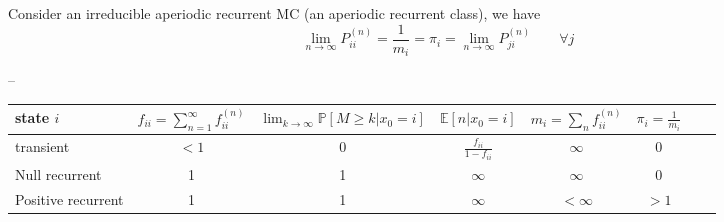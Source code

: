 \begin{theorem}
Consider an irreducible aperiodic recurrent MC (an aperiodic recurrent class), we have
$$ \lim_{n\to \infty} P_{ii}^{(n)} = \frac{1}{m_i} = \pi_i = \lim_{n\to\infty} P_{ji}^{(n)} \qquad \forall j$$
\end{theorem}
--

\begin{center}
    \begin{tabular}{|l*{6}{|c}r}
        \hline
    state $i$ & $f_{ii} = \sum_{n=1}^\infty f_{ii}^{(n)}$  & $\lim_{k \to \infty } \mathbb{P}[M \geq k | x_0=i]$ & $\mathbb{E}[n|x_0=i]$ & $m_i = \sum_n f_{ii}^{(n)}$ & $\pi_i = \frac{1}{m_i}$  \\ \hline
    
    transient & $<1$ & 0 & $\frac{f_{ii}}{1-f_{ii}}$ & $\infty$ & 0 \\ \hline
    Null recurrent & 1 & 1 & $\infty$ & $\infty$ & 0 \\ \hline
    Positive recurrent & 1 & 1 & $\infty$ & $<\infty$ & $>1$ \\ \hline
        \end{tabular}
\end{center}

